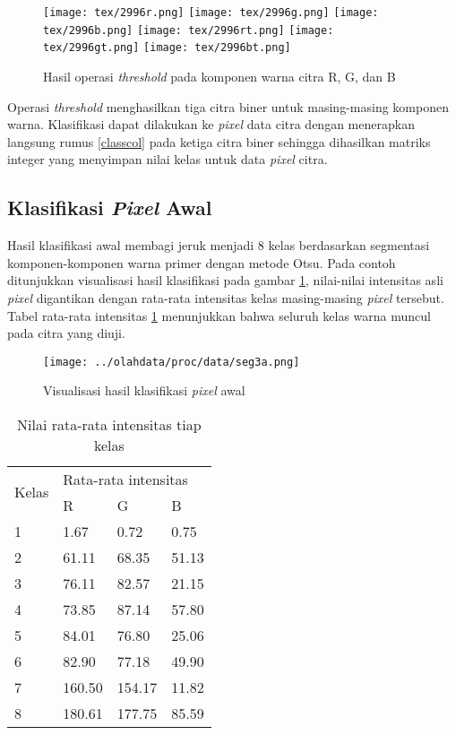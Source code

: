 \documentclass[laporan.tex]{subfiles}
\begin{document}
\begin{figure}[h!]
\centering
\texttt{[image: tex/2996r.png]} \hskip 0.5cm
\texttt{[image: tex/2996g.png]} \hskip 0.5cm
\texttt{[image: tex/2996b.png]}
\vskip 1cm
\texttt{[image: tex/2996rt.png]} \hskip 0.5cm
\texttt{[image: tex/2996gt.png]} \hskip 0.5cm
\texttt{[image: tex/2996bt.png]}
\caption{Hasil operasi \emph{threshold} pada komponen warna citra R, G, dan B}
\end{figure}

Operasi \emph{threshold} menghasilkan tiga citra biner untuk masing-masing komponen warna. Klasifikasi dapat dilakukan ke \emph{pixel} data citra dengan menerapkan langsung \mbox{rumus} \ref{classcol} pada ketiga citra biner sehingga dihasilkan matriks integer yang menyimpan nilai kelas untuk data \emph{pixel} citra.

\subsection{Klasifikasi \emph{Pixel} Awal}

Hasil klasifikasi awal membagi jeruk menjadi 8 kelas berdasarkan segmentasi komponen-komponen warna primer dengan metode Otsu. Pada contoh ditunjukkan visualisasi hasil klasifikasi pada gambar \ref{fig:classinit}, nilai-nilai intensitas asli \emph{pixel} digantikan dengan rata-rata intensitas kelas masing-masing \emph{pixel} tersebut. Tabel rata-rata intensitas \ref{table:clsrgbavg1} menunjukkan bahwa seluruh kelas warna muncul pada citra yang diuji.

\begin{figure}[h]
\centering
\texttt{[image: ../olahdata/proc/data/seg3a.png]}
\caption{Visualisasi hasil klasifikasi \emph{pixel} awal}
\label{fig:classinit}
\end{figure}

\begin{table}[h]
\centering
\begin{tabular}{|l|l|l|l|}
\cline{1-4}
\multirow{2}{*}{Kelas} & \multicolumn{3}{l|}{Rata-rata intensitas} \\
\cline{2-4}
 & R & G & B \\
\cline{1-4}
1 & 1.67 & 0.72 & 0.75 \\
2 & 61.11 & 68.35 & 51.13 \\
3 & 76.11 & 82.57 & 21.15 \\
4 & 73.85 & 87.14 & 57.80 \\
5 & 84.01 & 76.80 & 25.06 \\
6 & 82.90 & 77.18 & 49.90 \\
7 & 160.50 & 154.17 & 11.82 \\
8 & 180.61 & 177.75 & 85.59 \\
\cline{1-4}
\end{tabular}
\caption{Nilai rata-rata intensitas tiap kelas}
\label{table:clsrgbavg1}
\end{table}
\end{document}
